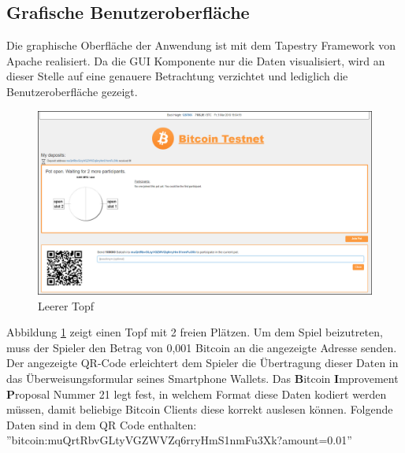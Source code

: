 \subsection{Grafische Benutzeroberfläche}\label{ssec:btc_gui}

Die graphische Oberfläche der Anwendung ist mit dem Tapestry Framework von Apache realisiert. Da die GUI Komponente nur die Daten visualisiert, wird an dieser Stelle auf eine genauere Betrachtung verzichtet und lediglich die Benutzeroberfläche gezeigt.


\begin{figure}[H]
\centering
\includegraphics[width=1\linewidth]{Figures/btc_gui/pot_open_empty}
\decoRule
\caption{Leerer Topf}
\label{fig:pot_open_empty}
\end{figure}
Abbildung \ref{fig:pot_open_empty} zeigt einen Topf mit 2 freien Plätzen. Um dem Spiel beizutreten, muss der Spieler den Betrag von 0,001 Bitcoin an die angezeigte Adresse senden. Der angezeigte QR-Code erleichtert dem Spieler die Übertragung dieser Daten in das Überweisungsformular seines Smartphone Wallets. Das \textbf{B}itcoin \textbf{I}mprovement \textbf{P}roposal Nummer 21\citep{bip21} legt fest, in welchem Format diese Daten kodiert werden müssen, damit beliebige Bitcoin Clients diese korrekt auslesen können. 
Folgende Daten sind in dem QR Code enthalten:\\ ''bitcoin:muQrtRbvGLtyVGZWVZq6rryHmS1nmFu3Xk?amount=0.01''


